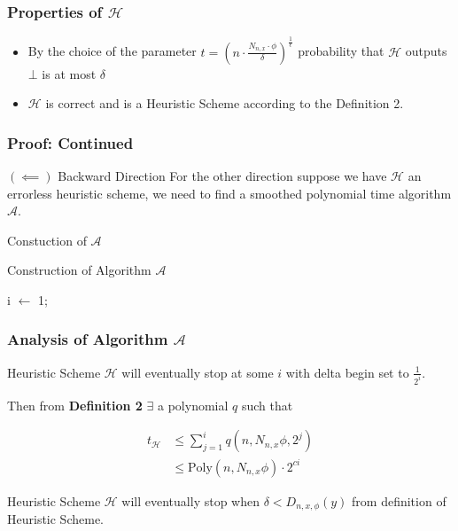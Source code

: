 \begin{frame}
    \frametitle{Properties of $\mathcal{H}$}

    \begin{itemize}
        \item By the choice of the parameter $t = (n \cdot \frac{N_{n, x} \cdot \phi}{\delta}) ^{\frac{1}{\epsilon}}$ probability that $\mathcal{H}$ outputs $\bot$ is at most $\delta$
        \item $\mathcal{H}$ is correct and is a Heuristic Scheme according to the Definition 2.
    \end{itemize}

\end{frame}

\begin{frame}
    \frametitle{Proof: Continued}

    $(\impliedby)$ Backward Direction
    For the other direction suppose we have $\mathcal{H}$ an errorless heuristic scheme, we need to find a smoothed polynomial time
    algorithm $\mathcal{A}$.

    \vspace{2em}

    Constuction of $\mathcal{A}$

    \begin{algorithm}[H]
        \caption{Construction of Algorithm $\mathcal{A}$}
        i $\gets$ 1;\\
    \end{algorithm}

\end{frame}

\begin{frame}
    \frametitle{Analysis of Algorithm {$\mathcal{A}$}}

    Heuristic Scheme $\mathcal{H}$ will eventually stop at some $i$ with delta begin set to $\frac{1}{2^i}$.

    Then from \textbf{Definition 2} $\exists$ a polynomial $q$ such that

    
    \begin{align*}
        t_{\mathcal{H}} &\leq \displaystyle\sum_{j = 1}^{i} q(n, N_{n,x} \phi, 2^j)\\
        &\leq \text{Poly}(n, N_{n,x} \phi) \cdot 2^{ci}
    \end{align*}

    Heuristic Scheme $\mathcal{H}$ will eventually stop when $\delta < D_{n,x,\phi}(y)$ from definition of Heuristic Scheme.
\end{frame}

